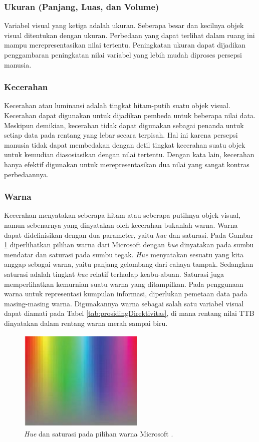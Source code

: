 \subsubsection{Ukuran (Panjang, Luas, dan Volume)}
Variabel visual yang ketiga adalah ukuran. Seberapa besar dan kecilnya objek visual ditentukan dengan ukuran. Perbedaan yang dapat terlihat dalam ruang ini mampu merepresentasikan nilai tertentu. Peningkatan ukuran dapat dijadikan penggambaran peningkatan nilai variabel yang lebih mudah diproses persepsi manusia. 
\subsubsection{Kecerahan}
Kecerahan atau luminansi adalah tingkat hitam-putih suatu objek visual. Kecerahan dapat digunakan untuk dijadikan pembeda untuk beberapa nilai data. Meskipun demikian, kecerahan tidak dapat digunakan sebagai penanda untuk setiap data pada rentang yang lebar secara terpisah. Hal ini karena persepsi manusia tidak dapat membedakan dengan detil tingkat kecerahan suatu objek untuk kemudian diasosiasikan dengan nilai tertentu. Dengan kata lain, kecerahan hanya efektif digunakan untuk merepresentasikan dua nilai yang sangat kontras perbedaannya.
\subsubsection{Warna}
Kecerahan menyatakan seberapa hitam atau seberapa putihnya objek visual, namun sebenarnya yang dinyatakan oleh kecerahan bukanlah warna. Warna dapat didefinisikan dengan dua parameter, yaitu \textit{hue} dan saturasi. Pada Gambar \ref{fig:macam-warna} diperlihatkan pilihan warna dari Microsoft dengan \textit{hue} dinyatakan pada sumbu mendatar dan saturasi pada sumbu tegak. \textit{Hue} menyatakan sesuatu yang kita anggap sebagai warna, yaitu panjang gelombang dari cahaya tampak. Sedangkan saturasi adalah tingkat \textit{hue} relatif terhadap keabu-abuan. Saturasi juga memperlihatkan kemurnian suatu warna yang ditampilkan. Pada penggunaan warna untuk representasi kumpulan informasi, diperlukan pemetaan data pada masing-masing warna. Digunakannya warna sebagai salah satu variabel visual dapat diamati pada Tabel \ref{tab:prosidingDirektivitas}, di mana rentang nilai TTB dinyatakan dalam rentang warna merah sampai biru.
\begin{figure}[t!]
    \centering
    \includegraphics[width=6cm]{Gambar/macam-warna.jpg}
    \caption{\textit{Hue} dan saturasi pada pilihan warna Microsoft \cite{buku_visual}.}
    \label{fig:macam-warna}
\end{figure}
